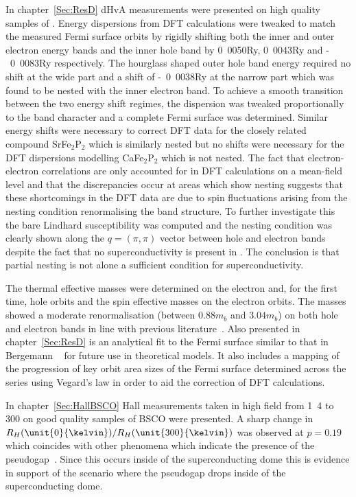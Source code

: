 
In chapter~\ref{Sec:ResD} \ac{dHvA} measurements were presented on high quality samples of \BaFeP. Energy dispersions from \ac{DFT} calculations were tweaked to match the measured Fermi surface orbits by rigidly shifting both the inner and outer electron energy bands and the inner hole band by \unit{0.0050}{\textrm{Ry}}, \unit{0.0043}{\textrm{Ry}} and \unit{-0.0083}{\textrm{Ry}} respectively. The hourglass shaped outer hole band energy required no shift at the wide part and a shift of \unit{-0.0038}{\textrm{Ry}} at the narrow part which was found to be nested with the inner electron band. To achieve a smooth transition between the two energy shift regimes, the dispersion was tweaked proportionally to the \DzTwo band character and a complete Fermi surface was determined. Similar energy shifts were necessary to correct \ac{DFT} data for the closely related compound SrFe$_2$P$_2$ which is similarly nested but no shifts were necessary for the \ac{DFT} dispersions modelling CaFe$_2$P$_2$ which is not nested. The fact that electron-electron correlations are only accounted for in \ac{DFT} calculations on a mean-field level and that the discrepancies occur at areas which show nesting suggests that these shortcomings in the \ac{DFT} data are due to spin fluctuations arising from the nesting condition renormalising the band structure. To further investigate this the bare Lindhard susceptibility was computed and the nesting condition was clearly shown along the $q = (\pi, \pi)$ vector between hole and electron bands despite the fact that no superconductivity is present in \BaFeP. The conclusion is that partial nesting is not alone a sufficient condition for superconductivity.

The thermal effective masses were determined on the electron and, for the first time, hole orbits and the spin effective masses on the electron orbits. The masses showed a moderate renormalisation (between $\unit{0.88}{m_b}$ and $\unit{3.04}{m_b}$) on both hole and electron bands in line with previous literature~\cite{Shishido2010}.  Also presented in chapter~\ref{Sec:ResD} is an analytical fit to the Fermi surface similar to that in Bergemann \etal~\cite{Bergemann2000} for future use in theoretical models. It also includes a mapping of the progression of key orbit area sizes of the Fermi surface determined across the \BaFePAs series using Vegard's law in order to aid the correction of \ac{DFT} calculations.

In chapter~\ref{Sec:HallBSCO} Hall measurements taken in high field from \unit{1.4}{\kelvin} to \unit{300}{\kelvin} on good quality samples of \ac{BSCO} were presented. A sharp change in $R_H(\unit{0}{\kelvin})/R_H(\unit{300}{\kelvin})$ was observed at $p=0.19$ which coincides with other phenomena which indicate the presence of the pseudogap~\cite{Tallon2001}. Since this occurs inside of the superconducting dome this is evidence in support of the scenario where the pseudogap drops inside of the superconducting dome.

